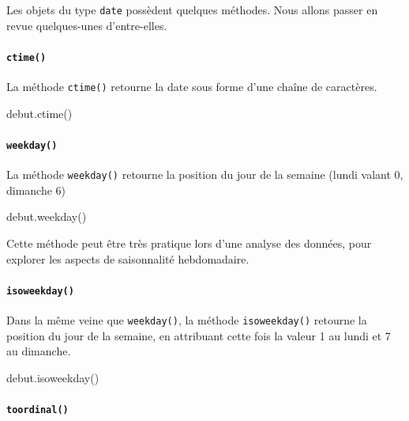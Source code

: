 \documentclass[12pt,]{book}
\newenvironment{Shaded}{\begin{snugshade}}{\end{snugshade}}
\newcommand{\NormalTok}[1]{#1}
\let\oldparagraph\paragraph
\renewcommand{\paragraph}[1]{\oldparagraph{#1}\mbox{}}
\numberwithin{equation}{section}
\numberwithin{countremarque}{section}
\let\BeginKnitrBlock\begin \let\EndKnitrBlock\end
\begin{document}
Les objets du type \texttt{date} possèdent quelques méthodes. Nous
allons passer en revue quelques-unes d'entre-elles.

\paragraph{\texorpdfstring{\texttt{ctime()}}{ctime()}}\label{ctime}

La méthode \texttt{ctime()} retourne la date sous forme d'une chaîne de
caractères.

\begin{Shaded}
\begin{Highlighting}[]
\NormalTok{debut.ctime()}
\end{Highlighting}
\end{Shaded}

\paragraph{\texorpdfstring{\texttt{weekday()}}{weekday()}}\label{weekday}

La méthode \texttt{weekday()} retourne la position du jour de la semaine
(lundi valant 0, dimanche 6)

\begin{Shaded}
\begin{Highlighting}[]
\NormalTok{debut.weekday()}
\end{Highlighting}
\end{Shaded}

\BeginKnitrBlock{remarque}
Cette méthode peut être très pratique lors d'une analyse des données,
pour explorer les aspects de saisonnalité hebdomadaire.
\EndKnitrBlock{remarque}

\paragraph{\texorpdfstring{\texttt{isoweekday()}}{isoweekday()}}\label{isoweekday}

Dans la même veine que \texttt{weekday()}, la méthode
\texttt{isoweekday()} retourne la position du jour de la semaine, en
attribuant cette fois la valeur 1 au lundi et 7 au dimanche.

\begin{Shaded}
\begin{Highlighting}[]
\NormalTok{debut.isoweekday()}
\end{Highlighting}
\end{Shaded}

\paragraph{\texorpdfstring{\texttt{toordinal()}}{toordinal()}}\label{toordinal}
\end{document}

